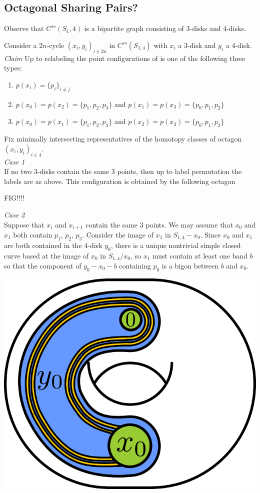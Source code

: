 \documentclass[11pt]{article}
\theoremstyle{remark}
\theoremstyle{definition}
\begin{document}
\subsection{ Octagonal Sharing Pairs?}

Observe that $C^{ss}(S_1,4)$ is a bipartite graph consisting of
3-disks and 4-disks.

Consider a $2n$-cycle $(x_i,y_i)_{i \in 2n}$ in $C^{ss}(S_{1,4})$
with $x_i$ a 3-disk and $y_i$ a 4-disk.\\

\emph{Claim} Up to relabeling the point configurations of is one of the following three
types:
\begin{enumerate}
  \item $p(x_i) =\{p_i\}_{i \neq j}$
  \item $p(x_0)=p(x_2)=\{p_1,p_2,p_3\}$ and $p(x_1)=p(x_3)=\{p_0,p_1,p_2\}$
  \item $p(x_0)=p(x_1)=\{p_1,p_2,p_3\}$ and $p(x_2)=p(x_3)=\{p_0,p_1,p_2\}$
\end{enumerate}

Fix minimally intersecting representatives of the homotopy classes of octagon
$(x_i, y_i)_{i \in 4}$.\\

\emph{Case 1}\\

If no two 3-disks contain the same 3 points, then up to label permutation
the labels are as above. This configuration is obtained by the following octagon

FIG!!!!


\emph{Case 2}\\

Suppose that  $x_i$ and $x_{i+1}$ contain the same 3 points.
We may assume that $x_0$ and $x_1$ both contain $p_1$, $p_2$, $p_3$.
Consider the image of $x_1$ in $S_{1,4}-x_0$.
Since $x_0$ and $x_1$ are both contained in the 4-disk $y_0$,
there is a unique nontrivial simple closed curve based at the image of $x_0$
in $S_{1,4}/x_0$, so $x_1$ must contain at least one band $b$ so that the
component of $y_0-x_0-b$ containing $p_0$ is a bigon between $b$ and $x_0$.


\includegraphics[width=.5\textwidth]{figures/outofx0.pdf}
\end{document}
